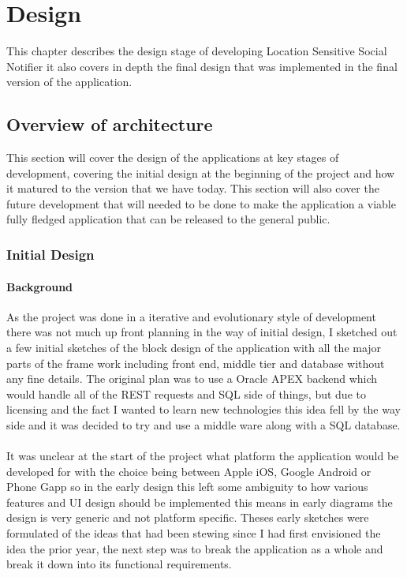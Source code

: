 \chapter{Design}

This chapter describes the design stage of developing Location Sensitive Social Notifier it also covers in depth the final design that was implemented in the final version of the application.

\section{Overview of architecture}

This section will cover the design of the applications at key stages of development, covering the initial design at the beginning of the project and how it matured to the version that we have today. This section will also cover the future development that will needed to be done to make the application a viable fully fledged application that can be released to the general public.

\subsection{Initial Design}

\subsubsection*{Background}

As the project was done in a iterative and evolutionary style of development there was not much up front planning in the way of initial design, I sketched out a few initial sketches of the block design of the application with all the major parts of the frame work including front end, middle tier and database without any fine details.
The original plan was to use a Oracle APEX backend which would handle all of the REST requests and SQL side of things, but due to licensing and the fact I wanted to learn new technologies this idea fell by the way side and it was decided to try and use a middle ware along with a SQL database. \\
\\
It was unclear at the start of the project what platform the application would be developed for with the choice being between Apple iOS, Google Android or Phone Gapp so in the early design this left some ambiguity to how various features and UI design should be implemented this means in early diagrams the design is very generic and not platform specific.
Theses early sketches were formulated of the ideas that had been stewing since I had first envisioned the idea the prior year, the next step was to break the application as a whole and break it down into its functional requirements.\\

